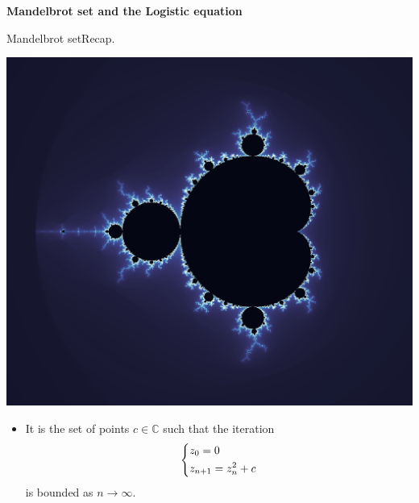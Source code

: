\documentclass[usenames,dvipsnames,svgnames,10pt,aspectratio=169]{beamer}
\begin{document}
\begin{frame}[t, c]{}
	\centering
	\vspace{1cm}

	{\Large \textbf{Mandelbrot set and the Logistic equation}}

	\bigskip

	{}

\end{frame}

\begin{frame}[t, c]{Mandelbrot set}{Recap.}

	\begin{minipage}{.48\textwidth}
		\centering
		\includegraphics[width=\columnwidth]{Mandelbrot_set}
	\end{minipage}%
	\hfill
	\begin{minipage}{.48\textwidth}
		\begin{itemize}
			\item It is the set of points $c \in \mathbb{C}$ such that the iteration
			\begin{equation}
				\left\{
				\begin{aligned}
					& z_0 = 0 \\
					& z_{n+1} = z_n^2 + c
				\end{aligned}
				\right.
				\notag
			\end{equation}
			is bounded as $n \to \infty$.
		\end{itemize}
	\end{minipage}
	\vspace{1cm}
\end{frame}
\end{document}
